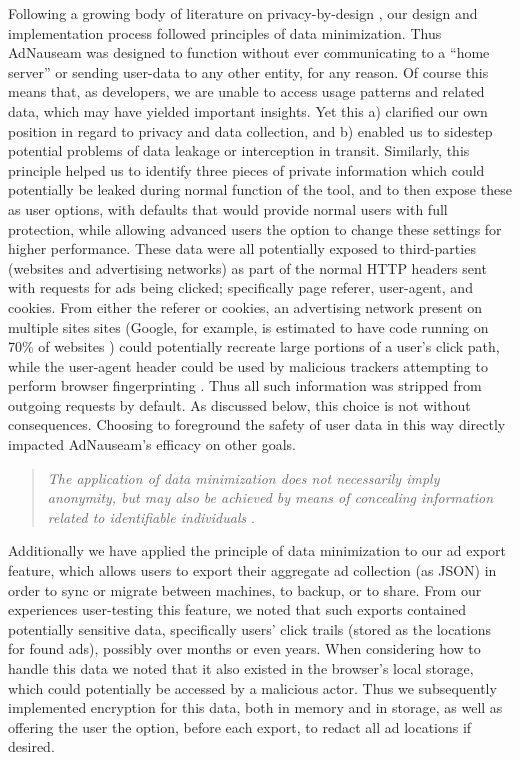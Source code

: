 \documentclass[conference]{IEEEtran}
\begin{document}
Following a growing body of literature on privacy-by-design \cite{Gurses-0, Hoepman, Gurses-1, Hansen, Cavoukian}, our design and implementation process followed principles of data minimization. Thus AdNauseam was designed to function without ever communicating to a “home server” or sending user-data to any other entity, for any reason. Of course this means that, as developers, we are unable to access usage patterns and related data, which may have yielded important insights. Yet this a) clarified our own position in regard to privacy and data collection, and b) enabled us to sidestep potential problems of data leakage or interception in transit. Similarly, this principle helped us to identify three pieces of private information which could potentially be leaked during normal function of the tool, and to then expose these as user options, with defaults that would provide normal users with full protection, while allowing advanced users the option to change these settings for higher performance. These data were all potentially exposed to third-parties (websites and advertising networks) as part of the normal HTTP headers sent with requests for ads being clicked; specifically page referer, user-agent, and cookies. From either the referer or cookies, an advertising network present on multiple sites sites (Google, for example, is estimated to have code running on 70\% of websites \cite{Englehardt}) could potentially recreate large portions of a user's click path, while the user-agent header could be used by malicious trackers attempting to perform browser fingerprinting \cite{Nikiforakis}. Thus all such information was stripped from outgoing requests by default. As discussed below, this choice is not without consequences. Choosing to foreground the safety of user data in this way directly impacted AdNauseam's efficacy on other goals.

\vspace{2mm}
\blockquote{\emph{The application of data minimization does not necessarily imply anonymity, but may also be achieved by means of concealing information related to identifiable individuals} \cite{Gurses-0}.}
\vspace{1mm}

Additionally we have applied the principle of data minimization to our ad export feature, which allows users to export their aggregate ad collection (as JSON) in order to sync or migrate between machines, to backup, or to share. From our experiences user-testing this feature, we noted that such exports contained potentially sensitive data, specifically users' click trails (stored as the locations for found ads), possibly over months or even years. When considering how to handle this data we noted that it also existed in the browser's local storage, which could potentially be accessed by a malicious actor. Thus we subsequently implemented encryption for this data, both in memory and in storage, as well as offering the user the option, before each export, to redact all ad locations if desired.
\end{document}
